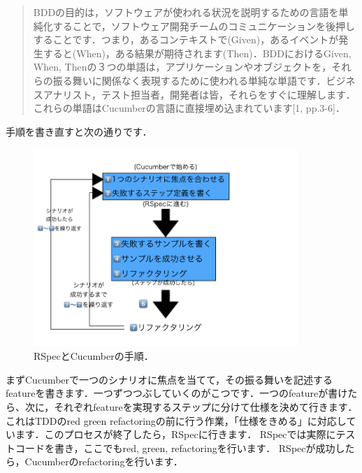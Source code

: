 \begin{quotation}
BDDの目的は，ソフトウェアが使われる状況を説明するための言語を単純化することで，ソフトウェア開発チームのコミュニケーションを後押しすることです．つまり，あるコンテキストで(Given)，あるイベントが発生すると(When)，ある結果が期待されます(Then)．BDDにおけるGiven, When, Thenの３つの単語は，アプリケーションやオブジェクトを，それらの振る舞いに関係なく表現するために使われる単純な単語です．ビジネスアナリスト，テスト担当者，開発者は皆，それらをすぐに理解します．これらの単語はCucumberの言語に直接埋め込まれています[1, pp.3-6]．

\end{quotation}
手順を書き直すと次の通りです．

\begin{figure}[htbp]\begin{center}
\includegraphics[width=10cm,bb= 0 0 737 453]{../figs/./my_help_nasu1.001.jpg}
\caption{RSpecとCucumberの手順．}
\label{default}\end{center}\end{figure}
まずCucumberで一つのシナリオに焦点を当てて，その振る舞いを記述するfeatureを書きます．一つずつつぶしていくのがこつです．一つのfeatureが書けたら、次に，それぞれfeatureを実現するステップに分けて仕様を決めて行きます．これはTDDのred green refactoringの前に行う作業，「仕様をきめる」に対応しています．このプロセスが終了したら，RSpecに行きます．
RSpecでは実際にテストコードを書き，ここでもred, green, refactoringを行います．
RSpecが成功したら，Cucumberのrefactoringを行います．

